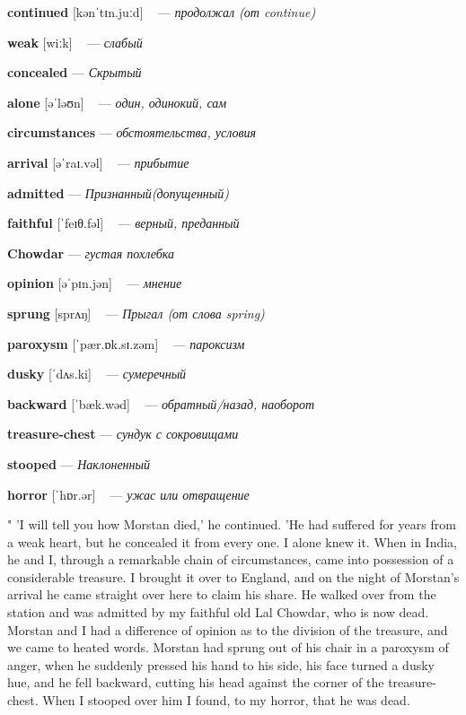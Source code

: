 \documentclass[a4paper,oneside,12pt]{amsart}
\begin{document}
{\large 

 {\bf continued } [kənˈtɪn.juːd] ~ --- \emph{ продолжал (от continue) }

{\bf weak } [wiːk] ~ --- \emph{ слабый }

{\bf concealed } --- \emph{ Скрытый }

{\bf alone } [əˈləʊn] ~ --- \emph{ один, одинокий, сам }

{\bf circumstances } --- \emph{ обстоятельства, условия }

{\bf arrival } [əˈraɪ.vəl] ~ --- \emph{ прибытие }

{\bf admitted } --- \emph{ Признанный(допущенный) }

{\bf faithful } [ˈfeɪθ.fəl] ~ --- \emph{ верный, преданный }

{\bf Chowdar } --- \emph{ густая похлебка }

{\bf opinion } [əˈpɪn.jən] ~ --- \emph{ мнение }

{\bf sprung } [sprʌŋ] ~ --- \emph{ Прыгал (от слова spring) }

{\bf paroxysm } [ˈpær.ɒk.sɪ.zəm] ~ --- \emph{ пароксизм }

{\bf dusky } [ˈdʌs.ki] ~ --- \emph{ сумеречный }

{\bf backward } [ˈbæk.wəd] ~ --- \emph{ обратный/назад, наоборот }

{\bf treasure-chest } --- \emph{ сундук с сокровищами }

{\bf stooped } --- \emph{ Наклоненный }

{\bf horror } [ˈhɒr.ər] ~ --- \emph{ ужас или отвращение }

} \vspace{6mm} {\Large 

 
" 'I will tell you how Morstan died,' he continued. 'He had suffered for years from a weak heart, but he concealed it from every one. I alone knew it. When in India, he and I, through a remarkable chain of circumstances, came into possession of a considerable treasure. I brought it over to England, and on the night of Morstan's arrival he came straight over here to claim his share. He walked over from the station and was admitted by my faithful old Lal Chowdar, who is now dead. Morstan and I had a difference of opinion as to the division of the treasure, and we came to heated words. Morstan had sprung out of his chair in a paroxysm of anger, when he suddenly pressed his hand to his side, his face turned a dusky hue, and he fell backward, cutting his head against the corner of the treasure-chest. When I stooped over him I found, to my horror, that he was dead.
\\ } 
\end{document}
